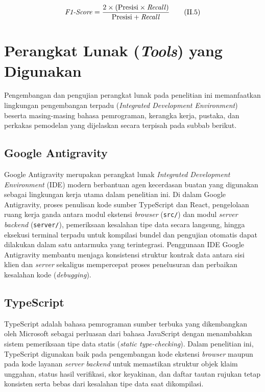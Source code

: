 \documentclass[12pt,a4paper,twoside]{report}
\begin{document}
\begin{equation}
  \text{\textit{F1-Score}} = \frac{2 \times (\text{Presisi} \times \text{\textit{Recall}})}{\text{Presisi} + \text{\textit{Recall}}}
  \tag{II.5}
\end{equation}

\section{Perangkat Lunak (\textit{Tools}) yang Digunakan}

Pengembangan dan pengujian perangkat lunak pada penelitian ini memanfaatkan lingkungan pengembangan terpadu (\textit{Integrated Development Environment}) beserta masing-masing bahasa pemrograman, kerangka kerja, pustaka, dan perkakas pemodelan yang dijelaskan secara terpisah pada subbab berikut.

\subsection{Google Antigravity}

Google Antigravity merupakan perangkat lunak \textit{Integrated Development Environment} (IDE) modern berbantuan agen kecerdasan buatan yang digunakan sebagai lingkungan kerja utama dalam penelitian ini. Di dalam Google Antigravity, proses penulisan kode sumber TypeScript dan React, pengelolaan ruang kerja ganda antara modul ekstensi \textit{browser} (\texttt{src/}) dan modul \textit{server} \textit{backend} (\texttt{server/}), pemeriksaan kesalahan tipe data secara langsung, hingga eksekusi terminal terpadu untuk kompilasi bundel dan pengujian otomatis dapat dilakukan dalam satu antarmuka yang terintegrasi. Penggunaan IDE Google Antigravity membantu menjaga konsistensi struktur kontrak data antara sisi klien dan \textit{server} sekaligus mempercepat proses penelusuran dan perbaikan kesalahan kode (\textit{debugging}).

\subsection{TypeScript}

TypeScript adalah bahasa pemrograman sumber terbuka yang dikembangkan oleh Microsoft sebagai perluasan dari bahasa JavaScript dengan menambahkan sistem pemeriksaan tipe data statis (\textit{static type-checking}). Dalam penelitian ini, TypeScript digunakan baik pada pengembangan kode ekstensi \textit{browser} maupun pada kode layanan \textit{server} \textit{backend} untuk memastikan struktur objek klaim unggahan, status hasil verifikasi, skor keyakinan, dan daftar tautan rujukan tetap konsisten serta bebas dari kesalahan tipe data saat dikompilasi.
\end{document}
